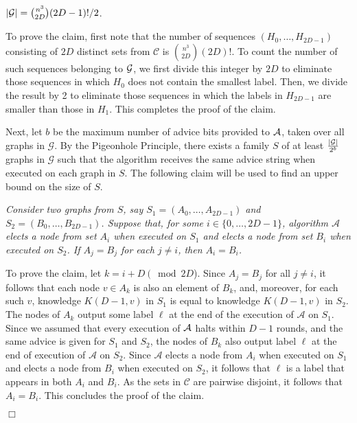 \documentclass[11pt]{article}
\newcommand{\qed}{\hfill $\Box$ \bigbreak}
\newenvironment{proof}{\noindent {\bf Proof.}}{\qed}
\begin{document}
\begin{proof}
\vspace{3mm} 
 $|{\cal G}|=\binom{n^3}{2D}(2D-1)!/2$.
\vspace{3mm}

To prove the claim, first note that the number of sequences $(H_0,\ldots,H_{2D-1})$ consisting of $2D$ distinct sets from $\mathcal{C}$ is $\binom{n^3}{2D}(2D)!$. To count the number of such sequences belonging to ${\cal G}$, we first divide this integer by $2D$ to eliminate those sequences in which $H_0$ does not contain the smallest label. Then, we divide the result by 2 to eliminate those sequences in which the labels in $H_{2D-1}$ are smaller than those in $H_1$. This completes the proof of the claim.


Next, let $b$ be the maximum number of advice bits provided to ${\cal A}$, taken over all graphs in $\mathcal{G}$. By the Pigeonhole Principle, there exists a family $S$ of at least $\frac{|{\cal G}|}{2^b}$ graphs in $\mathcal{G}$ such that the algorithm receives the same advice string when executed on each graph in $S$.
The following claim will be used to find an upper bound on the size of $S$. 

\vspace{3mm} 
\textit{Consider two graphs from $S$, say $S_1 = (A_0,\ldots,A_{2D-1})$ and $S_2 = (B_0,\ldots,B_{2D-1})$. Suppose that, for some $i \in \{0,\ldots,2D-1\}$, algorithm $\mathcal{A}$ elects a node from set $A_i$ when executed on $S_1$ and elects a node from set $B_i$ when executed on $S_2$. If $A_j = B_j$ for each $j \neq i$, then $A_i = B_i$.}
\vspace{3mm}

To prove the claim, let $k = i + D\ (\!\!\!\mod 2D$).
Since $A_j = B_j$ for all $j \neq i$, it follows that each node $v \in A_k$ is also an element of $B_k$, and, moreover, for each such $v$,
knowledge $K(D-1,v)$ in $S_1$ is equal to knowledge $K(D-1,v)$ in $S_2$.
The nodes of $A_k$ output some label $\ell$ at the end of the execution of $\mathcal{A}$ on $S_1$.
Since we assumed that every execution of $\cal A$ halts within $D-1$ rounds, and the same advice is given for $S_1$ and $S_2$, 
the nodes of $B_k$ also output label $\ell$ at the end of execution of $\mathcal{A}$ on $S_2$. Since $\mathcal{A}$ elects a node from $A_i$ when executed on $S_1$ and elects a node from $B_i$ when executed on $S_2$, it follows that $\ell$ is a label that appears in both $A_i$ and $B_i$. As the sets in $\mathcal{C}$ are pairwise disjoint, it follows that $A_i = B_i$. This concludes the proof of the claim.


\end{proof}
\end{document}
